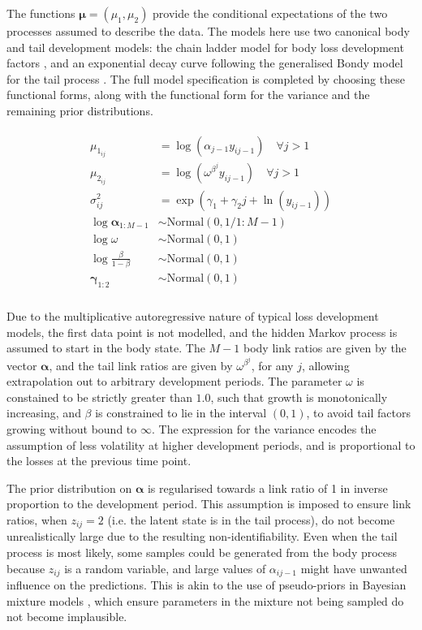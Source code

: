 The functions $\bm{\mu} = (\mu_{1}, \mu_{2})$ provide the conditional
expectations of the two processes assumed to describe the data.
The models here use two canonical body and tail development models:
the chain ladder model for body loss development factors
\citep{mack1993,englandverrall2002},
and an exponential decay curve following the generalised Bondy model
for the tail process \citep{tailfactors2013}.
The full model specification is completed by choosing these
functional forms, along with the functional form for the variance
and the remaining prior distributions.

\begin{align}
\begin{split}
    \mu_{1_{ij}} &= \log(\alpha_{j - 1} y_{ij-1}) \quad \forall j > 1\\
    \mu_{2_{ij}} &= \log(\omega^{\beta^{j}} y_{ij - 1}) \quad \forall j > 1\\
	\sigma_{ij}^2 &= \exp(\gamma_{1} + \gamma_{2} j + \ln(y_{ij-1}))\\
	\log \bm{\alpha}_{1:M - 1} &\sim \mathrm{Normal}(0, 1 / 1:M - 1)\\
    \log \omega &\sim \mathrm{Normal}(0, 1)\\
    \log \frac{\beta}{1 - \beta} &\sim \mathrm{Normal}(0, 1)\\
    \bm{\gamma}_{1:2} &\sim \mathrm{Normal}(0, 1)\\
\end{split}
\end{align}

Due to the multiplicative autoregressive nature of typical
loss development models, the first data point is not modelled,
and the hidden Markov process is assumed to start in the
body state.
The $M - 1$ body link ratios are given by the vector $\bm{\alpha}$,
and the tail link ratios are given by $\omega^{\beta^{j}}$, for any $j$,
allowing extrapolation out to arbitrary development periods.
The parameter $\omega$ is constained to be strictly greater than $1.0$,
such that growth is monotonically increasing,
and $\beta$ is constrained to lie in the interval $(0, 1)$, to avoid
tail factors growing without bound to $\infty$.
The expression for the variance encodes the assumption of
less volatility at higher development periods, and is proportional
to the losses at the previous time point.

The prior distribution on $\bm{\alpha}$ is regularised towards
a link ratio of 1 in inverse proportion to the development period.
This assumption is imposed to ensure link ratios, 
when $z_{ij} = 2$ (i.e. the latent state 
is in the tail process), do not become unrealistically
large due to the resulting non-identifiability. 
Even when the tail process
is most likely,
some samples could be generated from the body process because
$z_{ij}$ is a random variable, and large values of $\alpha_{ij-1}$
might have unwanted influence on the predictions.
This is akin to the use of pseudo-priors in Bayesian mixture
models \citep{carlinchib1995}, which ensure parameters in the mixture
not being sampled do not become implausible.

